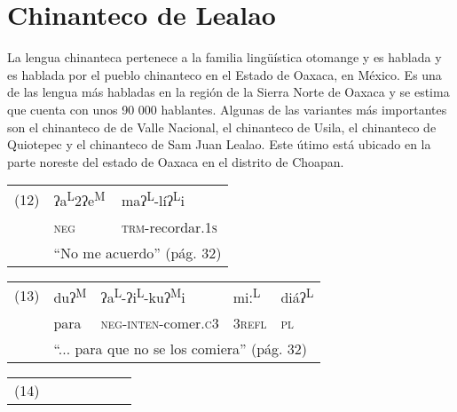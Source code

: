 \section*{Chinanteco de Lealao}

\noindent La lengua chinanteca pertenece a la familia lingüística otomange y es hablada y es hablada por el pueblo chinanteco en el Estado de Oaxaca, en México. Es una de las lengua más habladas en la región de la Sierra Norte de Oaxaca y se estima que cuenta con unos 90 000 hablantes. Algunas de las variantes más importantes son el chinanteco de de Valle Nacional, el chinanteco de Usila, el chinanteco de Quiotepec y el chinanteco de Sam Juan Lealao. Este útimo está ubicado en la parte noreste del estado de Oaxaca en el distrito de Choapan. \vspace{1cm}

{\setmainfont{Doulos SIL}
    \begin{tabular}{lll}
        (12) & ʔa\textsuperscript{L}2ʔe\textsuperscript{M}     & maʔ\textsuperscript{L}-líʔ\textsuperscript{L}i \\
             & \textsc{neg}                                    & \textsc{trm}-recordar.\textsc{1s}              \\
             & \multicolumn{2}{l}{``No me acuerdo'' (pág. 32)}
    \end{tabular} \vspace{0.5cm}

    \begin{tabular}{lllll}
        (13) & duʔ\textsuperscript{M}                                           & ʔa\textsuperscript{L}-ʔi\textsuperscript{L}-kuʔ\textsuperscript{M}i & miː\textsuperscript{L} & diáʔ\textsuperscript{L} \\
             & para                                                             & \textsc{neg}-\textsc{inten}-comer.\textsc{c}3                       & 3\textsc{refl}         & \textsc{pl}             \\
             & \multicolumn{4}{l}{``... para que no se los comiera'' (pág. 32)}
    \end{tabular} \vspace{0.5cm}

    \begin{tabular}{lllllll}
        (14) &
    \end{tabular}
}